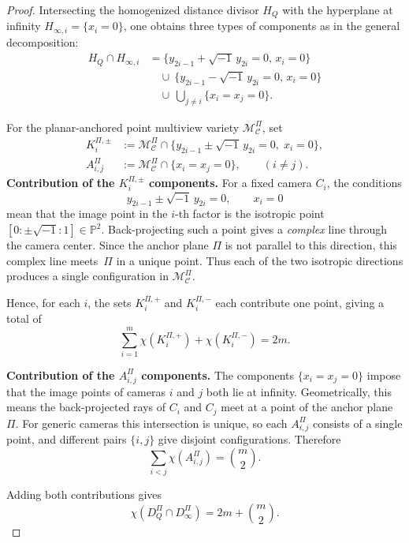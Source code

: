 \documentclass[10pt,a4paper]{amsart}
\newcommand{\PP}{\mathbb{P}}
\begin{document}
\begin{proof}
Intersecting the homogenized distance divisor $H_Q$ with the hyperplane at
infinity $H_{\infty,i}=\{x_i=0\}$, one obtains three types of components
as in the general decomposition:
\[
\begin{aligned}
H_Q\cap H_{\infty,i}
&=\{y_{2i-1}+\sqrt{-1}\,y_{2i}=0,\,x_i=0\} \\
&\quad\cup\ \{y_{2i-1}-\sqrt{-1}\,y_{2i}=0,\,x_i=0\} \\
&\quad\cup\ \bigcup_{j\neq i}\{x_i=x_j=0\}.
\end{aligned}
\]

For the planar-anchored point multiview variety $\mathcal{M}^\Pi_{\mathcal C}$, set 
\[
\begin{aligned}
K_{i}^{\Pi,\pm}
&:=\mathcal{M}^\Pi_{\mathcal C}\cap\{y_{2i-1}\pm\sqrt{-1}\,y_{2i}=0,\;x_i=0\},\\
A_{i,j}^{\Pi}
&:=\mathcal{M}^\Pi_{\mathcal C}\cap\{x_i=x_j=0\},
\qquad (i\neq j).
\end{aligned}
\]
\textbf{Contribution of the $K_i^{\Pi,\pm}$ components.}
For a fixed camera $C_i$, the conditions
\[
y_{2i-1}\pm\sqrt{-1}\,y_{2i}=0,\qquad x_i=0
\]
mean that the image point in the $i$-th factor is the isotropic point
\mbox{\([0:\pm \sqrt{-1}:1]\in\PP^2\).}
Back-projecting such a point gives a \emph{complex} line through the camera center. Since the anchor plane $\Pi$ is not parallel to this direction,
this complex line meets~$\Pi$ in a unique point.
Thus each of the two isotropic directions produces a single configuration in $\mathcal{M}^\Pi_{\mathcal C}$.

Hence, for each $i$, the sets $K_i^{\Pi,+}$ and $K_i^{\Pi,-}$ each contribute
one point, giving a total of
\[
\sum_{i=1}^m \chi(K_i^{\Pi,+})+\chi(K_i^{\Pi,-})
=2m.
\]

\textbf{Contribution of the $A_{i,j}^\Pi$ components.}
The components $\{x_i=x_j=0\}$ impose that the image points of cameras $i$ and $j$ both lie at infinity. Geometrically, this means the back-projected rays of
$C_i$ and $C_j$ meet at a point of the anchor plane $\Pi$.
For generic cameras this intersection is unique, so each $A_{i,j}^\Pi$
consists of a single point, and different pairs $\{i,j\}$ give disjoint
configurations. Therefore
\[
\sum_{i<j}\chi(A_{i,j}^\Pi)=\binom{m}{2}.
\]

Adding both contributions gives
\[
\chi(D_Q^\Pi\cap D_\infty^\Pi)
=2m+\binom{m}{2}.
\]
\end{proof}
\end{document}
